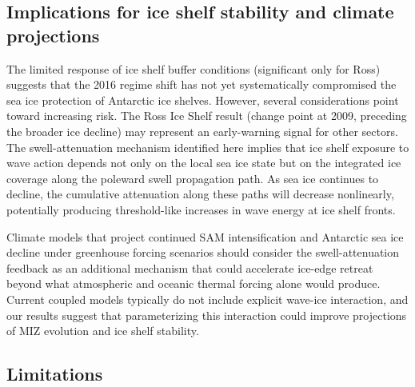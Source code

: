 \documentclass[11pt]{article}
\begin{document}
\subsection{Implications for ice shelf stability and climate projections}

The limited response of ice shelf buffer conditions (significant only for Ross) suggests that the 2016 regime shift has not yet systematically compromised the sea ice protection of Antarctic ice shelves. However, several considerations point toward increasing risk. The Ross Ice Shelf result (change point at 2009, preceding the broader ice decline) may represent an early-warning signal for other sectors. The swell-attenuation mechanism identified here implies that ice shelf exposure to wave action depends not only on the local sea ice state but on the integrated ice coverage along the poleward swell propagation path. As sea ice continues to decline, the cumulative attenuation along these paths will decrease nonlinearly, potentially producing threshold-like increases in wave energy at ice shelf fronts.

Climate models that project continued SAM intensification and Antarctic sea ice decline under greenhouse forcing scenarios should consider the swell-attenuation feedback as an additional mechanism that could accelerate ice-edge retreat beyond what atmospheric and oceanic thermal forcing alone would produce. Current coupled models typically do not include explicit wave-ice interaction\cite{Squire2020}, and our results suggest that parameterizing this interaction could improve projections of MIZ evolution and ice shelf stability.

\subsection{Limitations}
\end{document}
